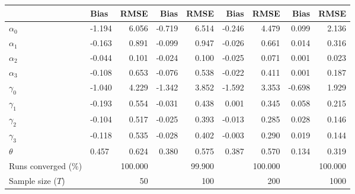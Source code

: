 
\begin{tabular}[t]{llrrrrrrr}
\toprule
  & Bias & RMSE & Bias & RMSE & Bias & RMSE & Bias & RMSE\\
\midrule
$\alpha_{0}$ & -1.194 & 6.056 & -0.719 & 6.514 & -0.246 & 4.479 & 0.099 & 2.136\\
$\alpha_{1}$ & -0.163 & 0.891 & -0.099 & 0.947 & -0.026 & 0.661 & 0.014 & 0.316\\
$\alpha_{2}$ & -0.044 & 0.101 & -0.024 & 0.100 & -0.025 & 0.071 & 0.001 & 0.023\\
$\alpha_{3}$ & -0.108 & 0.653 & -0.076 & 0.538 & -0.022 & 0.411 & 0.001 & 0.187\\
$\gamma_{0}$ & -1.040 & 4.229 & -1.342 & 3.852 & -1.592 & 3.353 & -0.698 & 1.929\\
$\gamma_{1}$ & -0.193 & 0.554 & -0.031 & 0.438 & 0.001 & 0.345 & 0.058 & 0.215\\
$\gamma_{2}$ & -0.104 & 0.517 & -0.025 & 0.393 & -0.013 & 0.285 & 0.028 & 0.146\\
$\gamma_{3}$ & -0.118 & 0.535 & -0.028 & 0.402 & -0.003 & 0.290 & 0.019 & 0.144\\
$\theta$ & 0.457 & 0.624 & 0.380 & 0.575 & 0.387 & 0.570 & 0.134 & 0.319\\
Runs converged (\%) &  & 100.000 &  & 99.900 &  & 100.000 &  & 100.000\\
Sample size ($T$) &  & 50 &  & 100 &  & 200 &  & 1000\\
\bottomrule
\end{tabular}
